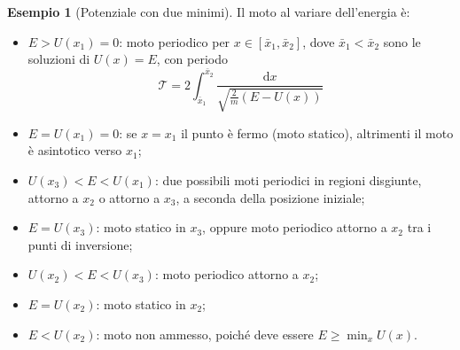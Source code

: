\documentclass[11pt, a4paper, openright]{book}
\theoremstyle{plain}
\theoremstyle{definition}
\newtheorem{esempio}[teorema]{Esempio}
\theoremstyle{remark}
\begin{document}
\begin{esempio}[Potenziale con due minimi]
    Il moto al variare dell'energia è:
    \begin{itemize}
        \item $E > U(x_1) = 0$: moto periodico per $x \in [\bar{x}_1, \bar{x}_2]$, dove $\bar{x}_1 < \bar{x}_2$ sono le soluzioni di $U(x) = E$, con periodo
        \begin{equation}
            \mathcal{T} = 2\int_{\bar{x}_1}^{\bar{x}_2} \frac{\mathrm{d}x}{\sqrt{\frac{2}{m}(E - U(x))}}
        \end{equation}
        \item $E = U(x_1) = 0$: se $x = x_1$ il punto è fermo (moto statico), altrimenti il moto è asintotico verso $x_1$;
        \item $U(x_3) < E < U(x_1)$: due possibili moti periodici in regioni disgiunte, attorno a $x_2$ o attorno a $x_3$, a seconda della posizione iniziale;
        \item $E = U(x_3)$: moto statico in $x_3$, oppure moto periodico attorno a $x_2$ tra i punti di inversione;
        \item $U(x_2) < E < U(x_3)$: moto periodico attorno a $x_2$;
        \item $E = U(x_2)$: moto statico in $x_2$;
        \item $E < U(x_2)$: moto non ammesso, poiché deve essere $E \geq \min_x U(x)$.
    \end{itemize}
\end{esempio}
\end{document}
